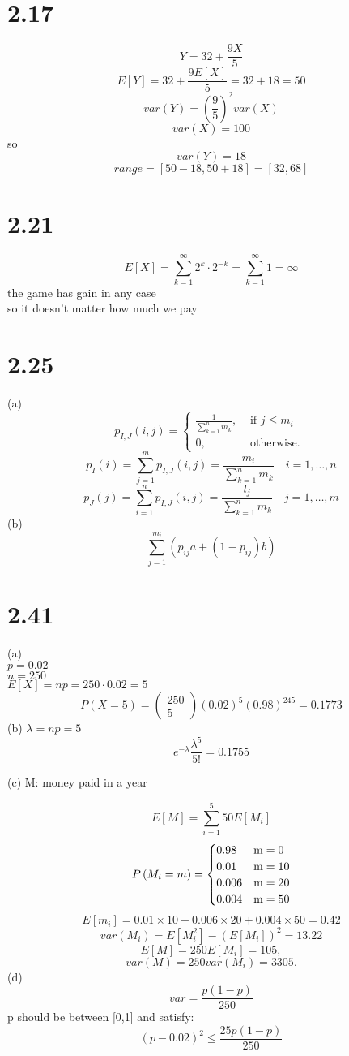 \documentclass{article}
\begin{document}
\section*{2.17}
$$Y=32+\frac{9 X}{ 5}$$
$$
E[Y]=32+\frac{9 E[X]}{ 5}=32+18=50
$$
$$
var(Y)=(\frac{9}{ 5})^{2} var(X)
$$
$$
var(X)=100
$$
so
$$
var(Y)=18
$$
$$
range=[50-18,50+18]=[32,68]
$$
\section*{2.21}
$$
E[X]=\sum_{k=1}^{\infty} 2^{k} \cdot 2^{-k}=\sum_{k=1}^{\infty} 1=\infty
$$
the game has gain in any case\\
so it doesn't matter how much we pay
\section*{2.25}
(a)
$$
p_{I, J}(i, j)= \begin{cases}\frac{1}{\sum_{k=1}^{n} m_{k}}, & \text { if } j \leq m_{i} \\ 0, & \text { otherwise. }\end{cases}
$$
$$
p_{I}(i)=\sum_{j=1}^{m} p_{I, J}(i, j)=\frac{m_{i}}{\sum_{k=1}^{n} m_{k}} \quad i=1, \ldots, n
$$
$$
p_{J}(j)=\sum_{i=1}^{n} p_{I, J}(i, j)=\frac{l_{j}}{\sum_{k=1}^{n} m_{k}} \quad j=1, \ldots, m
$$
(b)
$$
\sum_{j=1}^{m_{i}}\left(p_{i j} a+\left(1-p_{i j}\right) b\right)
$$

\section*{2.41}
(a)\\
$p=0.02$\\
$n=250$\\
$E[X]=n p=250 \cdot 0.02=5$\\
$$
P(X=5)=\left(\begin{array}{c}
250 \\
5
\end{array}\right)(0.02)^{5}(0.98)^{245}=0.1773
$$
(b)
$\lambda=n p=5$\\
$$
e^{-\lambda} \frac{\lambda^{5}}{5 !}=0.1755
$$

(c)
M: money paid in a year

$$
E[M]=\sum_{i=1}^{5} 50 E\left[M_{i}\right]
$$
$$
P\left(M_{i}=m\right)= \begin{cases}0.98 & \text m=0 \\ 0.01 & \text m=10 \\ 0.006 & \text m=20 \\ 0.004 & \text  m=50\end{cases}
$$
$$
E\left[m_{i}\right]=0.01 \times 10+0.006 \times 20+0.004 \times 50=0.42
$$
$$
var\left(M_{i}\right)=E\left[M_{i}^{2}\right]-\left(E\left[M_{i}\right]\right)^{2}=13.22
$$
$$
E[M]=250E\left[M_{i}\right]=105,
$$
$$
var(M)=250 var\left(M_{i}\right)=3305 .
$$
(d)
$$
var = \frac{p(1-p)}{250}
$$
p should be between [0,1] and satisfy:
$$
(p-0.02)^{2} \leq \frac{25 p(1-p)}{250}
$$
\end{document}
